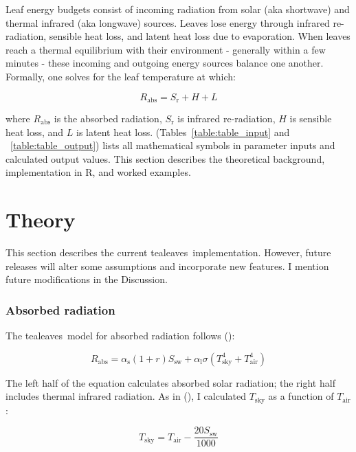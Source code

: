 \documentclass[11pt, oneside]{article}
\newcommand{\pkg}[1]{{\fontseries{b}\selectfont #1}}
\newcommand{\tealeaves}{\pkg{tealeaves}}
\begin{document}
Leaf energy budgets consist of incoming radiation from solar (aka shortwave) and thermal infrared (aka longwave) sources. Leaves lose energy through infrared re-radiation, sensible heat loss, and latent heat loss due to evaporation. When leaves reach a thermal equilibrium with their environment - generally within a few minutes - these incoming and outgoing energy sources balance one another. Formally, one solves for the leaf temperature at which:

\begin{equation}
  \label{eq:energy_budget}
  R_\mathrm{abs} = S_\mathrm{r} + H + L
\end{equation}

where $R_\mathrm{abs}$ is the absorbed radiation, $S_\mathrm{r}$ is infrared re-radiation, $H$ is sensible heat loss, and $L$ is latent heat loss. (Tables~\ref{table:table_input} and ~\ref{table:table_output}) lists all mathematical symbols in parameter inputs and calculated output values. This section describes the theoretical background, implementation in R, and worked examples.

\section*{Theory}

This section describes the current \tealeaves~implementation. However, future releases will alter some assumptions and incorporate new features. I mention future modifications in the Discussion.

\subsubsection*{Absorbed radiation}

The \tealeaves~model for absorbed radiation follows \citeauthor{Okajima_etal_2012} (\citeyear{Okajima_etal_2012}):

\begin{equation}
  R_\mathrm{abs} = \alpha_\mathrm{s} (1 + r) S_\mathrm{sw} + \alpha_\mathrm{l} \sigma (T_\mathrm{sky} ^ 4 + T_\mathrm{air} ^ 4)
\end{equation}

The left half of the equation calculates absorbed solar radiation; the right half includes thermal infrared radiation. As in \citeauthor{Okajima_etal_2012} (\citeyear{Okajima_etal_2012}), I calculated $T_\mathrm{sky}$ as a function of $T_\mathrm{air}$:

\begin{equation}
  T_\mathrm{sky} = T_\mathrm{air} - \frac{20 S_\mathrm{sw}}{1000}
\end{equation}
\end{document}
